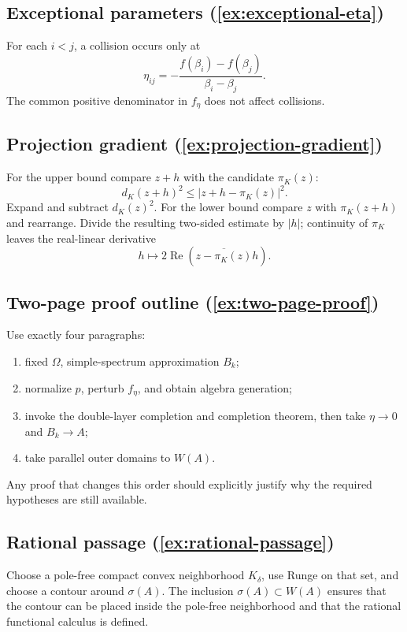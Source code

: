 \documentclass[11pt,oneside,openany]{book}
\theoremstyle{definition}
\theoremstyle{remark}
\newcommand{\RePart}{\operatorname{Re}}
\newcommand{\spec}{\sigma}
\begin{document}
\subsection*{Exceptional parameters (\cref{ex:exceptional-eta})}

For each \(i<j\), a collision occurs only at
\[
  \eta_{ij}
  =-\frac{f(\beta_i)-f(\beta_j)}
          {\beta_i-\beta_j}.
\]
The common positive denominator in \(f_\eta\) does not affect
collisions.

\subsection*{Projection gradient (\cref{ex:projection-gradient})}

For the upper bound compare \(z+h\) with the candidate
\(\pi_K(z)\):
\[
  d_K(z+h)^2
  \leq|z+h-\pi_K(z)|^2.
\]
Expand and subtract \(d_K(z)^2\).  For the lower bound compare \(z\)
with \(\pi_K(z+h)\) and rearrange.  Divide the resulting two-sided
estimate by \(|h|\); continuity of \(\pi_K\) leaves the real-linear
derivative
\[
  h\longmapsto2\RePart(
  \overline{z-\pi_K(z)}h).
\]

\subsection*{Two-page proof outline (\cref{ex:two-page-proof})}

Use exactly four paragraphs:
\begin{enumerate}
  \item fixed \(\Omega\), simple-spectrum approximation \(B_k\);
  \item normalize \(p\), perturb \(f_\eta\), and obtain algebra
  generation;
  \item invoke the double-layer completion and completion theorem,
  then take \(\eta\to0\) and \(B_k\to A\);
  \item take parallel outer domains to \(W(A)\).
\end{enumerate}
Any proof that changes this order should explicitly justify why the
required hypotheses are still available.

\subsection*{Rational passage (\cref{ex:rational-passage})}

Choose a pole-free compact convex neighborhood \(K_\delta\), use
Runge on that set, and choose a contour around
\(\spec(A)\).  The inclusion \(\spec(A)\subset W(A)\) ensures that
the contour can be placed inside the pole-free neighborhood and that
the rational functional calculus is defined.
\end{document}
